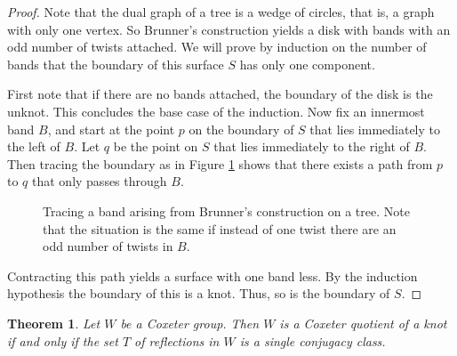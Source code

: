 \documentclass{article}
\newtheorem{theorem}{Theorem}[section]
\theoremstyle{definition}
\begin{document}
\begin{proof}
Note that the dual graph of a tree is a wedge of circles, that is, a graph with only one vertex. So Brunner's construction yields a disk with bands with an odd number of twists attached. We will prove by induction on the number of bands that the boundary of this surface $S$ has only one component.

First note that if there are no bands attached, the boundary of the disk is the unknot. This concludes the base case of the induction. Now  fix an innermost band $B$, and start at the point $p$ on the boundary of $S$ that lies immediately to the left of $B$. Let $q$ be the point on $S$ that lies immediately to the right of $B$. Then tracing the boundary as in Figure \ref{fig:tracing-band} shows that there exists a path from $p$ to $q$ that only passes through $B$.

\begin{figure}[htb]
\centering
{}
\caption{Tracing a band arising from Brunner's construction on a tree. Note that the situation is the same if instead of one twist there are an odd number of twists in $B$.}
\label{fig:tracing-band}
\end{figure}

Contracting this path yields a surface with one band less. By the induction hypothesis the boundary of this is a knot. Thus, so is the boundary of $S$.
\end{proof}

\begin{theorem}
Let $W$ be a Coxeter group. Then $W$ is a Coxeter quotient of a knot if and only if the set $T$ of reflections in $W$ is a single conjugacy class.
\end{theorem}
\end{document}
